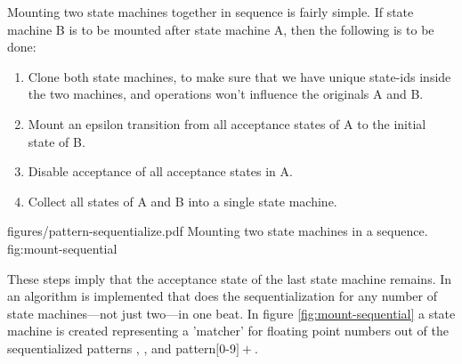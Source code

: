 Mounting two state machines together in sequence is fairly
simple. If state machine B is to be mounted after state machine
A, then the following is to be done:

\begin{enumerate}
\item Clone both state machines, to make sure that we have unique
      state-ids inside the two machines, and operations won't 
      influence the originals A and B.
\item Mount an epsilon transition from all acceptance states of A
      to the initial state of B.
\item Disable acceptance of all acceptance states in A.
\item Collect all states of A and B into a single state machine.
\end{enumerate}

\showpic
{figures/pattern-sequentialize.pdf}
{Mounting two state machines in a sequence.}
{fig:mount-sequential}

These steps imply that the acceptance state of the last state machine
remains. In {\Quex} an algorithm is implemented that does the sequentialization
for any number of state machines---not just two---in one beat.
In figure \ref{fig:mount-sequential} a state machine is created representing
a 'matcher' for floating point numbers out of the sequentialized patterns
\pattern{$[$0-9$]+$}, , and pattern{$[$0-9$]+$}.


